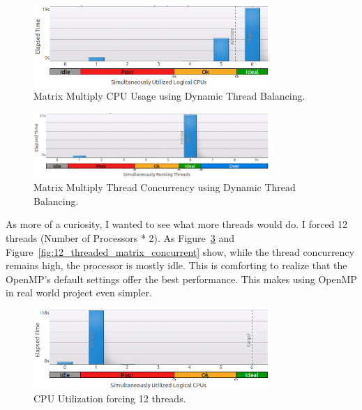 \documentclass[10pt]{article}
\begin{document}
\begin{figure}[h]
\begin{center}
\includegraphics[width=0.8\textwidth]{figures/matrix_dynamic_schedule_cpu_usage.png}
\caption{Matrix Multiply CPU Usage using Dynamic Thread Balancing.}
\label{fig:matrix_dynamic_schedule_cpu_usage}
\end{center}
\end{figure}

\begin{figure}[h]
\begin{center}
\includegraphics[width=0.8\textwidth]{figures/matrix_dynamic_schedule_thread_concurrency.png}
\caption{Matrix Multiply Thread Concurrency using Dynamic Thread Balancing.}
\label{fig:matrix_dynamic_schedule_concurrency}
\end{center}
\end{figure}


As more of a curiosity, I wanted to see what more threads would do.  I forced 12 threads 
(Number of Processors * 2).  As Figure~\ref{fig:12_threaded_matrix_cpu_usage} and 
Figure~\ref{fig:12_threaded_matrix_concurrent} show, while the thread concurrency remains
high, the processor is mostly idle.  This is comforting to realize that the OpenMP's default 
settings offer the best performance. This makes using OpenMP in real world project even simpler.


\begin{figure}[h]
\begin{center}
\includegraphics[width=0.8\textwidth]{figures/12_threaded_matrix_thread_cpu_usage_histogram.png}
\caption{CPU Utilization forcing 12 threads.}
\label{fig:12_threaded_matrix_cpu_usage}
\end{center}
\end{figure}
\end{document}
